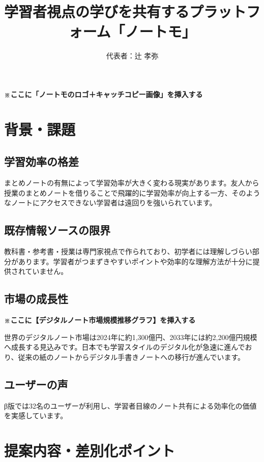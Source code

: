\documentclass[a4paper,12pt]{jsarticle}
\title{学習者視点の学びを共有するプラットフォーム「ノートモ」}
\author{代表者：辻 孝弥}
\date{}
\begin{document}
\maketitle

\begin{center}
\textbf{※ここに「ノートモのロゴ＋キャッチコピー画像」を挿入する}
\end{center}

\section{背景・課題}

\subsection{学習効率の格差}
まとめノートの有無によって学習効率が大きく変わる現実があります。友人から授業のまとめノートを借りることで飛躍的に学習効率が向上する一方、そのようなノートにアクセスできない学習者は遠回りを強いられています。

\subsection{既存情報ソースの限界}
教科書・参考書・授業は専門家視点で作られており、初学者には理解しづらい部分があります。学習者がつまずきやすいポイントや効率的な理解方法が十分に提供されていません。

\subsection{市場の成長性}
\textbf{※ここに【デジタルノート市場規模推移グラフ】を挿入する}

世界のデジタルノート市場は2024年に約1,300億円、2033年には約2,200億円規模へ成長する見込みです。日本でも学習スタイルのデジタル化が急速に進んでおり、従来の紙のノートからデジタル手書きノートへの移行が進んでいます。

\subsection{ユーザーの声}
β版では32名のユーザーが利用し、学習者目線のノート共有による効率化の価値を実感しています。

\newpage

\section{提案内容・差別化ポイント}
\end{document}

